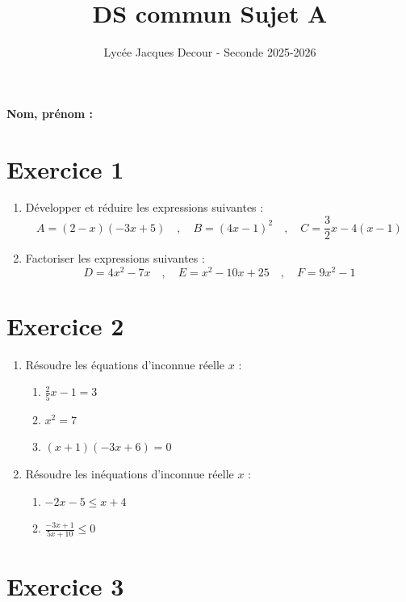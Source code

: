 \documentclass[12pt]{article}
\title{DS commun Sujet A}
\author{Lycée Jacques Decour - Seconde 2025-2026}
\date{}
\begin{document}
\maketitle

\textbf{Nom, prénom :} \dotfill

\section*{Exercice 1}

\begin{enumerate}
    \item Développer et réduire les expressions suivantes :
    \[
    A = (2 - x)(-3x + 5) \quad , \quad B = (4x - 1)^2 \quad , \quad C = \frac{3}{2}x - 4(x - 1)
    \]

    \item Factoriser les expressions suivantes :
    \[
    D = 4x^2 - 7x \quad , \quad E = x^2 - 10x + 25 \quad , \quad F = 9x^2 - 1
    \]
\end{enumerate}

\section*{Exercice 2}

\begin{enumerate}
    \item Résoudre les équations d'inconnue réelle $x$ :

    \begin{enumerate}
        \item $\frac{2}{5}x - 1 = 3$
        \item $x^2 = 7$
        \item $(x + 1)(-3x + 6) = 0$
    \end{enumerate}

    \item Résoudre les inéquations d'inconnue réelle $x$ :

    \begin{enumerate}
        \item $-2x - 5 \leq x + 4$
        \item $\frac{-3x + 1}{5x + 10} \leq 0$
    \end{enumerate}
\end{enumerate}

\section*{Exercice 3}
\end{document}
